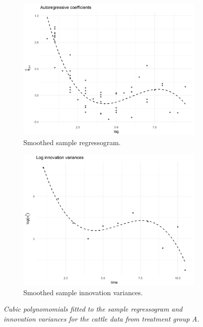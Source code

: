 \begin{figure}[H]
 \begin{subfigure}{.48\textwidth}
  \centering
\includegraphics[width = \textwidth]{img/cattle/cattleA-regressogram-with-cubic-smooth}
 \caption{Smoothed sample regressogram.} 
 \label{fig:cattleA-innovariogram-cubic-smooth}
 \end{subfigure}
 \begin{subfigure}{.48\textwidth}
  \centering
\includegraphics[width = \textwidth]{img/cattle/cattleA-innovariogram-with-cubic-smooth}
 \caption{Smoothed sample innovation variances.} 
\label{fig:cattleA-innovariogram-cubic-smooth}
 \end{subfigure}
 \caption{\textit{Cubic polynomomials fitted to the sample regressogram and innovation variances for the cattle data from treatment group A.}} \label{fig:cattleA-smoothed-regressogram-variogram}
\end{figure}


